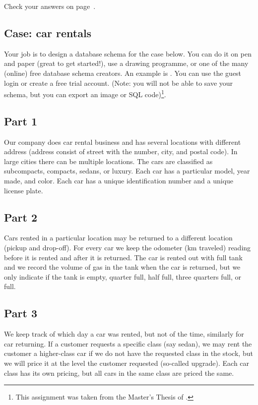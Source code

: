 \hfill{}Check your answers on page~\pageref{sect:ansrelational}.


\begin{subappendices}
\section{Case: car rentals}
\label{sect:schema}

Your job is to design a database schema for the case below. You can do it on
pen and paper (great to get started!), use a drawing programme, or one of the
many (online) free database schema creators. An example is
.  You can use the guest login or
create a free trial account. (Note: you will not be able to save your schema,
but you can export an image or SQL code)\footnote{
This assignment was taken from the Master's Thesis of
\citet{zhang2012suite}.
}.


\subsection*{Part 1}

Our company does car rental business and has several locations with different
address (address consist of street with the number, city, and postal code). In
large cities there can be multiple locations. The cars are classified as
subcompacts, compacts, sedans, or luxury. Each car has a particular model, year
made, and color. Each car has a unique identification number and a unique
license plate.

\subsection*{Part 2}

Cars rented in a particular location may be returned to a different location
(pickup and drop-off). For every car we keep the odometer (km traveled) reading
before it is rented and after it is returned. The car is rented out with full
tank and we record the volume of gas in the tank when the car is returned, but we
only indicate if the tank is empty, quarter full, half full, three quarters
full, or full.

\subsection*{Part 3}

We keep track of which day a car was rented, but not of the time, similarly for
car returning. If a customer requests a specific class (say sedan), we may rent
the customer a higher-class car if we do not have the requested class in the
stock, but we will price it at the level the customer requested (so-called
upgrade). Each car class has its own pricing, but all cars in the same class are
priced the same. 



\end{subappendices}
